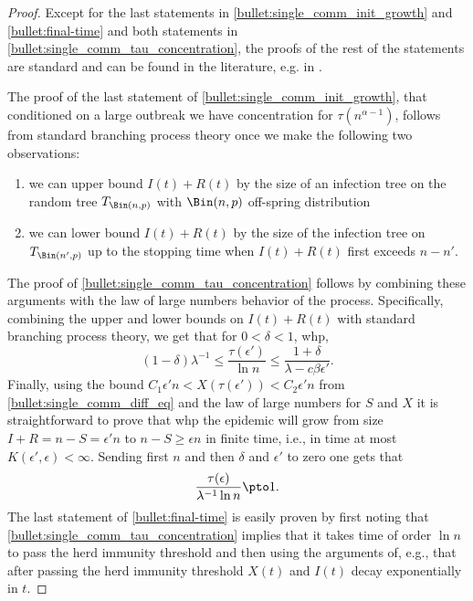 \documentclass[11pt]{article}
\begin{document}
\begin{proof}
Except for the last statements in \ref{bullet:single_comm_init_growth} and \ref{bullet:final-time} and both statements in  \ref{bullet:single_comm_tau_concentration},
    the proofs of the rest of the statements
        are standard and can be found in the literature, e.g. in \cite{neal2003sir, ball2020epidemics, borgs2024lawlargenumberssir}. 
        
        The proof of the last statement of \ref{bullet:single_comm_init_growth}, that conditioned on a large outbreak we have concentration for $\tau(n^{\alpha-1})$, follows from standard branching process theory once we make the following two observations:
        \begin{enumerate}[label=(\alph*)]
            \item we can upper bound $I(t)+R(t)$ by the size of an infection tree on the random tree $T_{\Bin(n,p)}$ with $\Bin(n,p)$ off-spring distribution
            \item we can  lower bound $I(t)+R(t)$ by the size of the infection tree on $T_{\Bin(n',p)}$ up to the stopping time when $I(t)+R(t)$ first exceeds $n-n'$.
        \end{enumerate}    
        The proof of  \ref{bullet:single_comm_tau_concentration} follows by combining these arguments with the law of large numbers behavior of the process. Specifically,  combining the upper and lower bounds on $I(t)+R(t)$ with standard branching process theory, we get that for $0<\delta<1$, whp, 
    \[
     (1-\delta)\lambda^{-1}\leq    \frac{\tau(\epsilon')}{\ln n}\leq \frac{1+\delta}{\lambda -c\beta\epsilon'}.
    \]
Finally, using the  bound $C_1\epsilon' n<X(\tau(\epsilon'))< C_2\epsilon' n$ from
 \ref{bullet:single_comm_diff_eq} and the law of large numbers for $S$ and $X$ it is straightforward 
 to prove that whp the epidemic will grow from size $I+R=n-S=\epsilon' n$ to $n-S\geq  \epsilon n$ in finite time, i.e., in time at most $K(\epsilon',\epsilon)<\infty.$  Sending first $n$ and then $\delta$ and $\epsilon'$ to zero one gets that 
    \[
        \frac{\tau(\epsilon)}{\lambda^{-1}\ln n} \pto 1.
    \]
The last statement of \ref{bullet:final-time} is easily proven by first noting that \ref{bullet:single_comm_tau_concentration} implies that it  takes time of order $\ln n$ to pass the herd immunity threshold and then using the arguments of, e.g., \cite{borgs2024lawlargenumberssir} that after passing the herd immunity threshold $X(t)$ and $I(t)$ decay exponentially in $t$.
  \end{proof}
\end{document}

